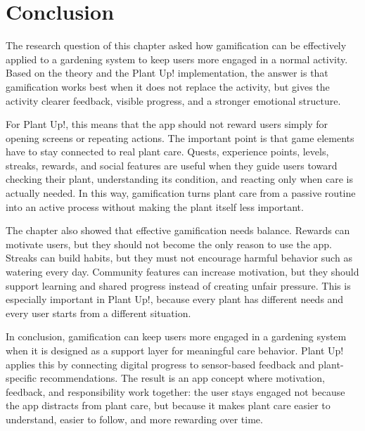 \section{Conclusion}

The research question of this chapter asked how gamification can be effectively applied to a gardening system to keep users more engaged in a normal activity. Based on the theory and the Plant Up! implementation, the answer is that gamification works best when it does not replace the activity, but gives the activity clearer feedback, visible progress, and a stronger emotional structure.

For Plant Up!, this means that the app should not reward users simply for opening screens or repeating actions. The important point is that game elements have to stay connected to real plant care. Quests, experience points, levels, streaks, rewards, and social features are useful when they guide users toward checking their plant, understanding its condition, and reacting only when care is actually needed. In this way, gamification turns plant care from a passive routine into an active process without making the plant itself less important.

The chapter also showed that effective gamification needs balance. Rewards can motivate users, but they should not become the only reason to use the app. Streaks can build habits, but they must not encourage harmful behavior such as watering every day. Community features can increase motivation, but they should support learning and shared progress instead of creating unfair pressure. This is especially important in Plant Up!, because every plant has different needs and every user starts from a different situation.

In conclusion, gamification can keep users more engaged in a gardening system when it is designed as a support layer for meaningful care behavior. Plant Up! applies this by connecting digital progress to sensor-based feedback and plant-specific recommendations. The result is an app concept where motivation, feedback, and responsibility work together: the user stays engaged not because the app distracts from plant care, but because it makes plant care easier to understand, easier to follow, and more rewarding over time.
